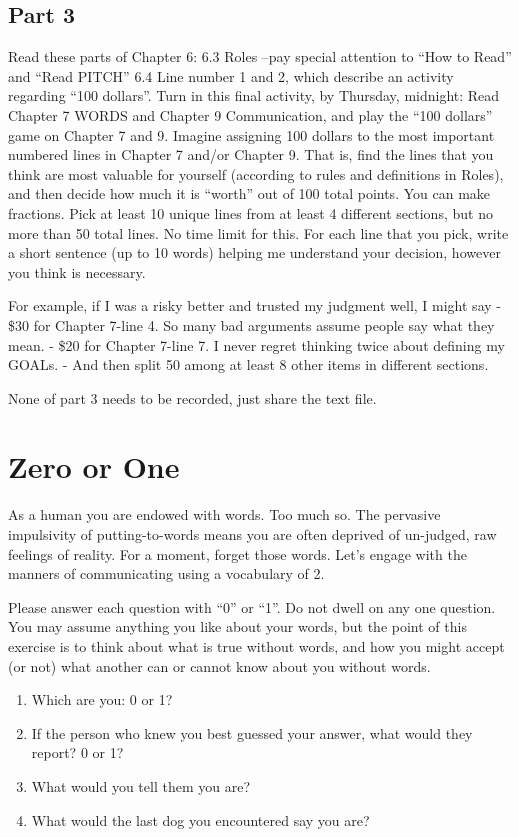 \documentclass[
]{book}
\providecommand{\tightlist}{%
  \setlength{\itemsep}{0pt}\setlength{\parskip}{0pt}}
\begin{document}
\section{Part 3}\label{part-3}

Read these parts of Chapter 6:
6.3 Roles --pay special attention to ``How to Read'' and ``Read PITCH''
6.4 Line number 1 and 2, which describe an activity regarding ``100 dollars''.
Turn in this final activity, by Thursday, midnight:
Read Chapter 7 WORDS and Chapter 9 Communication, and play the ``100 dollars'' game on Chapter 7 and 9. Imagine assigning 100 dollars to the most important numbered lines in Chapter 7 and/or Chapter 9.
That is, find the lines that you think are most valuable for yourself (according to rules and definitions in Roles), and then decide how much it is ``worth'' out of 100 total points. You can make fractions. Pick at least 10 unique lines from at least 4 different sections, but no more than 50 total lines. No time limit for this. For each line that you pick, write a short sentence (up to 10 words) helping me understand your decision, however you think is necessary.

For example, if I was a risky better and trusted my judgment well, I might say
- \$30 for Chapter 7-line 4. So many bad arguments assume people say what they mean.
- \$20 for Chapter 7-line 7. I never regret thinking twice about defining my GOALs.
- And then split 50 among at least 8 other items in different sections.

None of part 3 needs to be recorded, just share the text file.

\appendix


\chapter{Zero or One}\label{zero-or-one}

As a human you are endowed with words.
Too much so. The pervasive impulsivity of putting-to-words means you are often deprived
of un-judged, raw feelings of reality.
For a moment, forget those words.
Let's engage with the manners of communicating
using a vocabulary of 2.

Please answer each question with ``0'' or ``1''.
Do not dwell on any one question.
You may assume anything you like about your words,
but the point of this exercise is to think about what is true without words, and how you might accept (or not)
what another can or cannot know about you without words.

\begin{enumerate}
\def\labelenumi{\arabic{enumi}.}
\tightlist
\item
  Which are you: 0 or 1?
\item
  If the person who knew you best guessed your answer,
  what would they report? 0 or 1?
\item
  What would you tell them you are?
\item
  What would the last dog you encountered say you are?
\end{enumerate}
\end{document}
